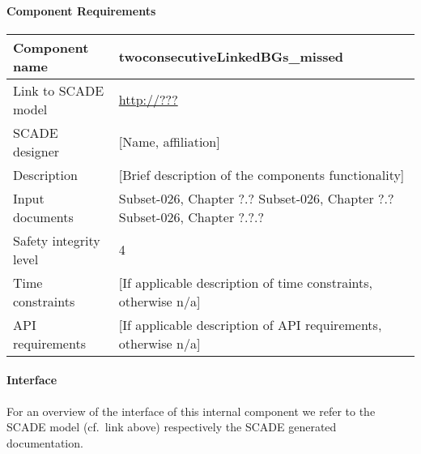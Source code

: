 
\paragraph{Component Requirements}

\begin{longtable}{p{}p{}}
\toprule
Component name			& twoconsecutiveLinkedBGs\_missed \\
\midrule
Link to SCADE model		& {\footnotesize \url{http://???}} \\
\midrule
SCADE designer			& [Name, affiliation] \\
\midrule
Description				& [Brief description of the components functionality] \\
\midrule
Input documents	& 
Subset-026, Chapter ?.?\newline
Subset-026, Chapter ?.?\newline
Subset-026, Chapter ?.?.?\\
\midrule
Safety integrity level		& 4 \\
\midrule
Time constraints		& [If applicable description of time constraints, otherwise n/a] \\
\midrule
API requirements 		& [If applicable description of API requirements, otherwise n/a] \\
\bottomrule
\end{longtable}


\paragraph{Interface}

For an overview of the interface of this internal component we refer to the SCADE model (cf.~link above) respectively the SCADE generated documentation.